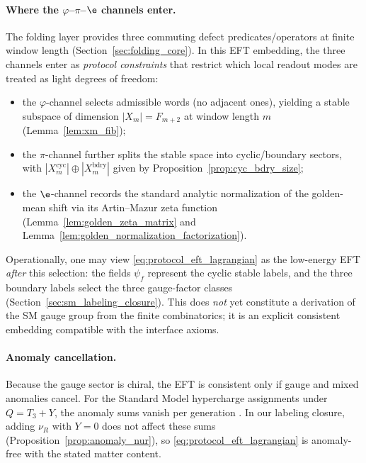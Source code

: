 \paragraph{Where the $\varphi$--$\pi$--$\e$ channels enter.}
The folding layer provides three commuting defect predicates/operators at finite window length (Section~\ref{sec:folding_core}).
In this EFT embedding, the three channels enter as \emph{protocol constraints} that restrict which local readout modes are treated as light degrees of freedom:
\begin{itemize}
\item the $\varphi$-channel selects admissible words (no adjacent ones), yielding a stable subspace of dimension $|X_m|=F_{m+2}$ at window length $m$ (Lemma~\ref{lem:xm_fib});
\item the $\pi$-channel further splits the stable space into cyclic/boundary sectors, with $|X_m^{\mathrm{cyc}}|\oplus |X_m^{\mathrm{bdry}}|$ given by Proposition~\ref{prop:cyc_bdry_size};
\item the $\e$-channel records the standard analytic normalization of the golden-mean shift via its Artin--Mazur zeta function (Lemma~\ref{lem:golden_zeta_matrix} and Lemma~\ref{lem:golden_normalization_factorization}).
\end{itemize}
Operationally, one may view \eqref{eq:protocol_eft_lagrangian} as the low-energy EFT \emph{after} this selection: the fields $\psi_f$ represent the cyclic stable labels, and the three boundary labels select the three gauge-factor classes (Section~\ref{sec:sm_labeling_closure}).
This does \emph{not} yet constitute a derivation of the SM gauge group from the finite combinatorics; it is an explicit consistent embedding compatible with the interface axioms.

\paragraph{Anomaly cancellation.}
Because the gauge sector is chiral, the EFT is consistent only if gauge and mixed anomalies cancel.
For the Standard Model hypercharge assignments under $Q=T_3+Y$, the anomaly sums vanish per generation \cite{BouchiatIliopoulosMeyer1972,PeskinSchroeder1995,PDGRPP2024}.
In our labeling closure, adding $\nu_R$ with $Y=0$ does not affect these sums (Proposition~\ref{prop:anomaly_nur}), so \eqref{eq:protocol_eft_lagrangian} is anomaly-free with the stated matter content.

